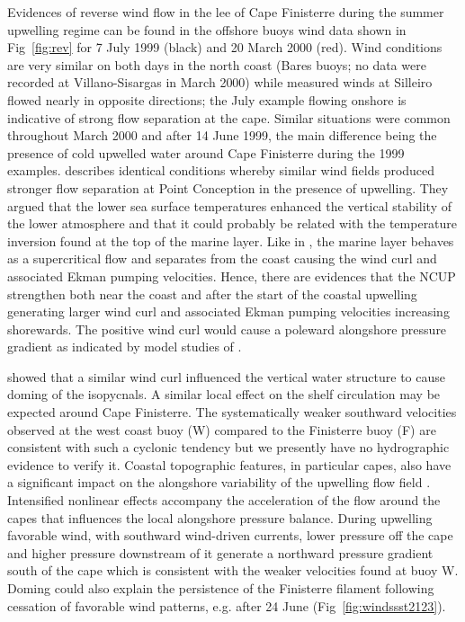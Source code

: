 Evidences of reverse wind flow in the lee of Cape Finisterre
during the summer upwelling regime can be found in the offshore
buoys wind data shown in Fig~\ref{fig:rev} for 7 July 1999 (black)
and 20 March 2000 (red). Wind conditions are very similar on both
days in the north coast (Bares buoys; no data were recorded at
Villano-Sisargas in March 2000) while measured winds at Silleiro
flowed nearly in opposite directions; the July example flowing
onshore is indicative of strong flow separation at the cape.
Similar situations were common throughout March 2000 and after 14
June 1999, the main difference being the presence of cold upwelled
water around Cape Finisterre during the 1999 examples.
\nocite{munchow00} describes
identical conditions whereby similar wind fields produced stronger
flow separation at Point Conception in the presence of upwelling.
They argued that the lower sea surface temperatures enhanced the
vertical stability of the lower atmosphere and that it could
probably be related with the temperature inversion found at the
top of the marine layer. Like in \nocite{Enriquez95}, the marine layer behaves as a
supercritical flow and separates from the coast causing the wind
curl and associated Ekman pumping velocities. Hence, there are
evidences that the NCUP strengthen both near the coast and after
the start of the coastal upwelling generating larger wind curl and
associated Ekman pumping velocities increasing shorewards. The
positive wind curl would cause a poleward alongshore pressure
gradient as indicated by model studies of \citet{Wang97}.

\nocite{munchow00} showed that
a similar wind curl influenced the vertical water structure to
cause doming of the isopycnals.  A similar local effect on the
shelf circulation may be expected around Cape Finisterre. The
systematically weaker southward velocities observed at the west
coast buoy (W) compared to the Finisterre buoy (F) are consistent
with such a cyclonic tendency but we presently have no
hydrographic evidence to verify it. Coastal topographic features,
in particular capes, also have a significant impact on the
alongshore variability of the upwelling flow field
\citep{Crepon84,Dale01,Rosenfeld94}. Intensified nonlinear effects
accompany the acceleration of the flow around the capes that
influences the local alongshore pressure balance. During upwelling
favorable wind, with southward wind-driven currents, lower
pressure off the cape and higher pressure downstream of it
generate a northward pressure gradient south of the cape which is
consistent with the weaker velocities found at buoy W. Doming
could also explain the persistence of the Finisterre filament
following cessation of favorable wind patterns, e.g. after 24 June
(Fig~\ref{fig:windssst2123}).
